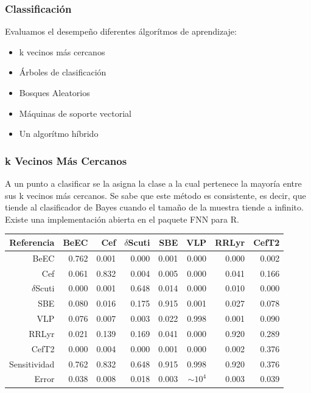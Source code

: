 \documentclass{beamer}
\begin{document}
\begin{frame}
  \frametitle{Classificación}
  Evaluamos el desempeño diferentes álgorítmos de aprendizaje:
  \begin{itemize}
  \item k vecinos más cercanos
  \item Árboles de clasificación
  \item Bosques Aleatorios
  \item Máquinas de soporte vectorial
  \item Un algorítmo híbrido
  \end{itemize}
\end{frame}
\begin{frame}%
  \frametitle{k Vecinos Más Cercanos}
A un punto a clasificar se la asigna la clase a la cual pertenece la mayoría entre sus k vecinos más cercanos. Se sabe que este método es consistente, es decir, que tiende al clasificador de Bayes cuando el tamaño de la muestra tiende a infinito. Existe una implementación abierta en el paquete FNN para R.

\begin{table}[ht]
  \centering
  \resizebox{0.7\textwidth}{!} {
    \begin{tabular}{rrrrrrrr}
      \hline
      Referencia& BeEC & Cef & $\delta$Scuti & SBE & VLP & RRLyr & CefT2 \\ 
      \hline
      BeEC & 0.762 & 0.001 & 0.000 & 0.001 & 0.000 & 0.000 & 0.002 \\ 
      Cef & 0.061 & 0.832 & 0.004 & 0.005 & 0.000 & 0.041 & 0.166 \\ 
      $\delta$Scuti & 0.000 & 0.001 & 0.648 & 0.014 & 0.000 & 0.010 & 0.000 \\ 
      SBE & 0.080 & 0.016 & 0.175 & 0.915 & 0.001 & 0.027 & 0.078 \\ 
      VLP & 0.076 & 0.007 & 0.003 & 0.022 & 0.998 & 0.001 & 0.090 \\ 
      RRLyr & 0.021 & 0.139 & 0.169 & 0.041 & 0.000 & 0.920 & 0.289 \\ 
      CefT2 & 0.000 & 0.004 & 0.000 & 0.001 & 0.000 & 0.002 & 0.376 \\ 
      \hline
      Sensitividad & 0.762 & 0.832 & 0.648 & 0.915 & 0.998 & 0.920 & 0.376 \\ 
      \hline
      Error & 0.038 & 0.008 & 0.018 & 0.003 & $\sim 10^{4}$ & 0.003 & 0.039 \\ 
      \hline
    \end{tabular}
  }
\end{table}
\end{frame}
\end{document}
